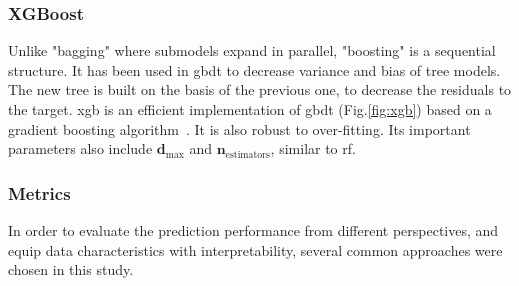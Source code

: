 \documentclass[twoside,twocolumn,9pt]{article}
\begin{document}
\subsubsection{XGBoost}\label{mtd:xgb}
Unlike "bagging" where submodels expand in parallel, "boosting" is a sequential structure. It has been used in \acrfull*{gbdt} to decrease variance and bias of tree models\cite{friedman2001greedy}. The new tree is built on the basis of the previous one, to decrease the residuals to the target. \acrlong*{xgb} is an efficient implementation of \acrshort*{gbdt} (Fig.\ref{fig:xgb}) based on a gradient boosting algorithm~\cite{chen2015xgboost}. It is also robust to over-fitting. 
 Its important parameters also include $\mathbf{d}_\textrm{max}$ and $\mathbf{n}_\textrm{estimators}$, similar to \acrshort*{rf}. 
\subsubsection{Metrics}
In order to evaluate the prediction performance from different perspectives, and equip data characteristics with interpretability, several common approaches were chosen in this study. 
\end{document}

